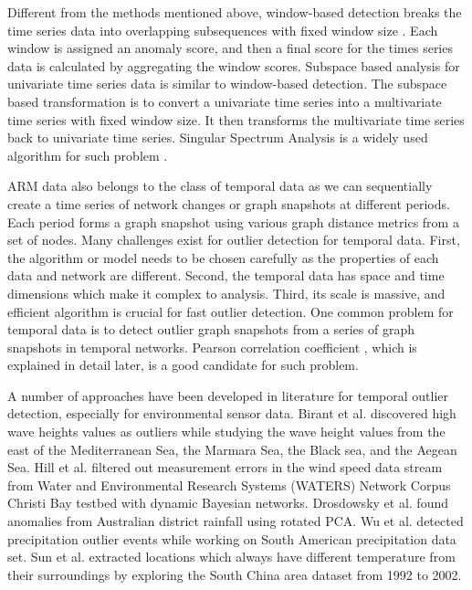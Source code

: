 Different from the methods mentioned above, window-based detection 
breaks the time series data into overlapping subsequences with fixed
window size \cite{cheboli2010anomaly}. Each window is assigned an
anomaly score, and then a final score for the times series data is
calculated by aggregating the window scores. Subspace based analysis for
univariate time series data is similar to window-based detection. The
subspace based transformation is to convert a univariate time series
into a multivariate time series with fixed window size. It then
transforms the multivariate time series back to univariate time series.
Singular Spectrum Analysis is a widely used algorithm for such problem
\cite{golyandina2013singular}.

ARM data also belongs to the class of temporal data as we can sequentially create a
time series of network changes or graph snapshots at different periods.
Each period forms a graph snapshot using various graph distance metrics
from a set of nodes. Many challenges exist for outlier detection for
temporal data. First, the algorithm or model needs to be chosen
carefully as the properties of each data and network are different.
Second, the temporal data has space and time dimensions which make it
complex to analysis. Third, its scale is massive, and efficient algorithm
is crucial for fast outlier detection. One common problem for temporal
data is to detect outlier graph snapshots from a series of graph snapshots
in temporal networks. Pearson correlation coefficient , which is explained 
in detail later, is a good candidate for such problem. 

A number of approaches have been developed in literature for temporal outlier detection,
especially for environmental sensor data. Birant et al.
\cite{kut2006spatio} discovered high wave heights values as outliers 
while studying the wave height values from the east of
the Mediterranean Sea, the Marmara Sea, the Black sea, and the
Aegean Sea. Hill et al. \cite{hill2007real, hill2010anomaly}
filtered out measurement errors in the wind speed data stream from
Water and Environmental Research Systems (WATERS) Network Corpus
Christi Bay testbed with dynamic Bayesian networks. Drosdowsky et
al. \cite{drosdowsky1993analysis} found anomalies from Australian
district rainfall using rotated PCA. Wu et al. \cite{wu2010spatio}
detected precipitation outlier events while working on South
American precipitation data set. Sun et al.
\cite{yuxiang2005detecting} extracted locations which always have
different temperature from their surroundings by exploring the
South China area dataset from 1992 to 2002.

